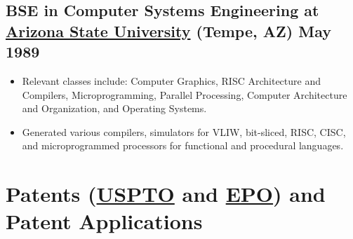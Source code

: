 \documentclass[10pt,letterpaper,oneside]{report}
\begin{document}
\medskip

\begin{minipage}{\textwidth}
  \subsection[BSE in Computer Systems Engineering]{
    BSE in Computer Systems Engineering at
    \href{https://engineering.asu.edu/undergraduate-degree-programs}
    {Arizona State University} {\small (Tempe, AZ)} \hfill May 1989
  }

  \begin{itemize}
    \item Relevant classes include: Computer Graphics, RISC Architecture and
      Compilers, Microprogramming, Parallel Processing, Computer Architecture
      and Organization, and Operating Systems.

    \item Generated various compilers, simulators for VLIW, bit-sliced, RISC,
      CISC, and microprogrammed processors for functional and procedural
      languages.
  \end{itemize}
\end{minipage}

\section[Patents (USPTO and EPO) and Patent Applications]{
  Patents
  (\href{http://patft.uspto.gov/netacgi/nph-Parser?Sect1=PTO2&Sect2=HITOFF&p=1&u=/netahtml/PTO/search-bool.html&r=0&f=S&l=50&TERM1=voltz&FIELD1=INNM&co1=AND&TERM2=christopher&FIELD2=INNM&d=PTXT}
  {USPTO} and
  \href{http://v3.espacenet.com/searchResults?locale=en_EP&ST=quick&IA=voltz+christopher&compact=false&DB=EPODOC&submitted=true}
  {EPO})
  and Patent Applications
}
\end{document}
